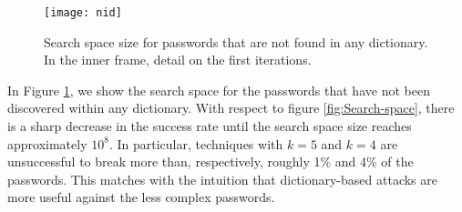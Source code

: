 \documentclass[a4paper,twocolumn]{article}
\begin{document}
\begin{figure}
\begin{centering}
\texttt{[image: nid]}
\par\end{centering}

\caption{\label{fig:Variant-of-figure}Search space size for passwords that
are not found in any dictionary. In the inner frame, detail on the
first iterations.}

\end{figure}


In Figure \ref{fig:Variant-of-figure}, we show the search space for
the passwords that have not been discovered within any dictionary.
With respect to figure \ref{fig:Search-space}, there is a sharp decrease
in the success rate until the search space size reaches approximately
$10^{8}$. In particular, techniques with $k=5$ and $k=4$ are unsuccessful
to break more than, respectively, roughly 1\% and 4\% of the passwords.
This matches with the intuition that dictionary-based attacks are
more useful against the less complex passwords.
\end{document}
